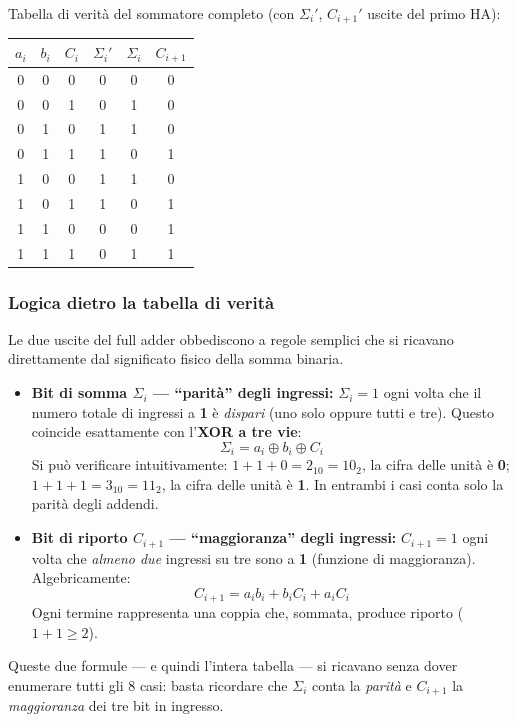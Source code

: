 \documentclass[11pt,a4paper]{report}
\begin{document}
\noindent Tabella di verità del sommatore completo (con $\Sigma_i'$, $C_{i+1}'$ uscite del primo HA):

\begin{center}
\begin{tabular}{ccc|ccc}
\toprule
$a_i$ & $b_i$ & $C_i$ & $\Sigma_i'$ & $\Sigma_i$ & $C_{i+1}$\\
\midrule
0&0&0&0&0&0\\
0&0&1&0&1&0\\
0&1&0&1&1&0\\
0&1&1&1&0&1\\
1&0&0&1&1&0\\
1&0&1&1&0&1\\
1&1&0&0&0&1\\
1&1&1&0&1&1\\
\bottomrule
\end{tabular}
\end{center}

\subsubsection*{Logica dietro la tabella di verità}

Le due uscite del full adder obbediscono a regole semplici che si ricavano direttamente dal significato fisico della somma binaria.

\begin{itemize}
    \item \textbf{Bit di somma $\Sigma_i$ — ``parità'' degli ingressi:}
    $\Sigma_i = 1$ ogni volta che il numero totale di ingressi a \textbf{1} è \emph{dispari} (uno solo oppure tutti e tre). Questo coincide esattamente con l'\textbf{XOR a tre vie}:
    \[
        \Sigma_i = a_i \oplus b_i \oplus C_i
    \]
    Si può verificare intuitivamente: $1+1+0 = 2_{10} = 10_2$, la cifra delle unità è \textbf{0}; $1+1+1 = 3_{10} = 11_2$, la cifra delle unità è \textbf{1}. In entrambi i casi conta solo la parità degli addendi.

    \item \textbf{Bit di riporto $C_{i+1}$ — ``maggioranza'' degli ingressi:}
    $C_{i+1} = 1$ ogni volta che \emph{almeno due} ingressi su tre sono a \textbf{1} (funzione di maggioranza). Algebricamente:
    \[
        C_{i+1} = a_i b_i + b_i C_i + a_i C_i
    \]
    Ogni termine rappresenta una coppia che, sommata, produce riporto ($1+1 \ge 2$).
\end{itemize}

Queste due formule — e quindi l'intera tabella — si ricavano senza dover enumerare tutti gli 8 casi: basta ricordare che $\Sigma_i$ conta la \emph{parità} e $C_{i+1}$ la \emph{maggioranza} dei tre bit in ingresso.
\end{document}
